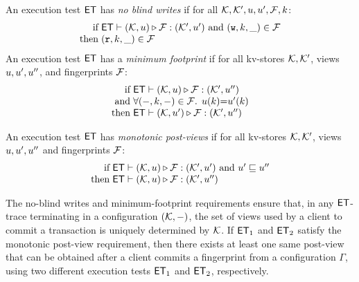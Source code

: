 \begin{definition}[$\ET$ properties]
\label{def:et_properties}
An execution test $\ET$ has \emph{no blind writes} if
for all $\mathcal{K}, \mathcal{K}', u, u', \mathcal{F}, k$:\\
\[
\begin{array}{@{} r @{\hspace{3pt}} l @{}}
\text{if} & \ET \vdash (\hh, \vi) \triangleright \opset: (\hh',\vi' ) 
\text{ and } (\otW, \ke, \_) \in \opset \\
\text{then} & (\otR, \ke, \_) \in \opset
\end{array} 
\]
An execution test $\ET$ has a \emph{minimum footprint} if for all kv-stores $\mathcal{K}, \mathcal{K}'$,
views $u, u',u''$, and fingerprints $\mathcal{F}$: 
%
\[
\begin{array}{@{} r @{\hspace{3pt}} l @{}}
    \text{if} & \ET \vdash (\hh, \vi) \triangleright \opset : (\hh', \vi'')  \\
    \text{and} & \fora{(\stub, \ke, \stub) \in \f} \vi(\ke) {=} \vi'(\ke) \\
\text{then} & \ET \vdash (\hh, \vi') \triangleright \opset : (\hh', \vi'')
\end{array} 
\]
%

An execution test $\ET$ has \emph{monotonic post-views} if 
for all kv-stores $\mathcal{K},\mathcal{K}'$, 
views $u, u',u''$ and fingerprints $\mathcal{F}$:
\[
\begin{array}{@{} r @{\hspace{3pt}} l @{}}
    \text{if} & \ET \vdash (\hh, \vi) \triangleright \opset : (\hh',\vi' )
    \text{ and } \vi' \sqsubseteq \vi''  \\
    \text{then} & \ET \vdash (\hh, \vi) \triangleright \opset : (\hh',\vi'')
\end{array} 
\]
\end{definition}
The no-blind writes and minimum-footprint requirements ensure that, in any $\ET$-trace 
terminating in a configuration $(\mathcal{K}, -)$, 
the set of views used by a client to commit a transaction is uniquely determined by $\mathcal{K}$. 
If $\mathsf{ET}_1$ and $\mathsf{ET}_2$ satisfy the monotonic post-view requirement, then there exists at least one  same post-view 
that can be obtained after a client commits a fingerprint from a configuration $\Gamma$, 
using two different execution tests $\mathsf{ET}_1$ and $\mathsf{ET}_2$, respectively. 

